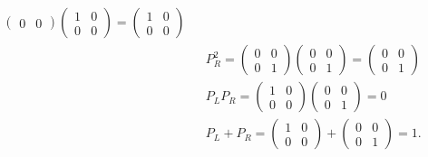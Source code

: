 \documentclass[11pt]{article}
\begin{document}
\begin{itemize}
\begin{eqnarray}
\begin{pmatrix}
            0 & 0
        \end{pmatrix}
        \begin{pmatrix}
            1 & 0\\
            0 & 0
        \end{pmatrix}
        =
        \begin{pmatrix}
            1 & 0\\
            0 & 0
        \end{pmatrix}\\
        &&P_R^2=
        \begin{pmatrix}
            0 & 0\\
            0 & 1
        \end{pmatrix}
        \begin{pmatrix}
            0 & 0\\
            0 & 1
        \end{pmatrix}
        =        
        \begin{pmatrix}
            0 & 0\\
            0 & 1
        \end{pmatrix}\\
        &&P_LP_R=
        \begin{pmatrix}
            1 & 0\\
            0 & 0
        \end{pmatrix}
        \begin{pmatrix}
            0 & 0\\
            0 & 1
        \end{pmatrix}
        =0 \\
        &&P_L+P_R=
        \begin{pmatrix}
            1 & 0\\
            0 & 0
        \end{pmatrix}
        +
        \begin{pmatrix}
            0 & 0\\
            0 & 1
        \end{pmatrix}
        =1.
    \end{eqnarray}
\end{itemize}
\end{document}

